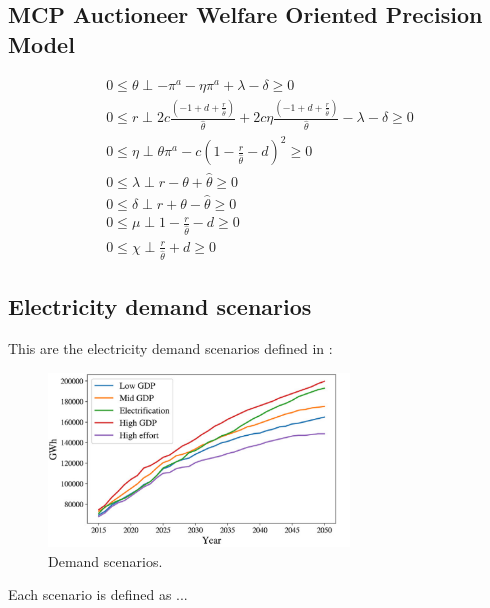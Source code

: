 \documentclass[a4paper,fleqn]{cas-dc}
\begin{document}
\subsection{MCP Auctioneer Welfare Oriented Precision Model}\label{Appendix:mcpWOP}
\begin{align}
    0 \leq \theta \perp -\pi^a   - \eta\pi^a  + \lambda -  \delta \geq 0\\
   0 \leq r \perp 2c\frac{(-1+d+\frac{r}{\hat{\theta}})}{\hat{\theta}} + 2c\eta \frac{(-1+d+\frac{r}{\hat{\theta}})}{\hat{\theta}} - \lambda - \delta  \geq 0\\
0 \leq \eta \perp \theta \pi^a - c(1-\frac{r}{\hat{\theta}}-d)^2 \geq 0 \\
0 \leq \lambda \perp r - \theta + \hat{\theta} \geq 0 \\
0 \leq \delta \perp r + \theta - \hat{\theta} \geq 0\\
0 \leq \mu \perp 1-\frac{r}{\hat{\theta}}-d \geq 0\\
0 \leq\chi \perp \frac{r}{\hat{\theta}} + d \geq 0 
\end{align}


\subsection{Electricity demand scenarios} \label{Appendix:demandscenarios}

This are the electricity demand scenarios defined in \cite{amigo_two_2021}:

\begin{figure}[h]
    \centering
    \includegraphics[width=8cm]{Submissions/EnergyPolicy/Images/demanda energetica segun escenario.png}
    \caption{{\footnotesize Demand scenarios.}}
    \label{fig:demandaescenarios}
\end{figure}

Each scenario is defined as ... 

%





\end{document}
